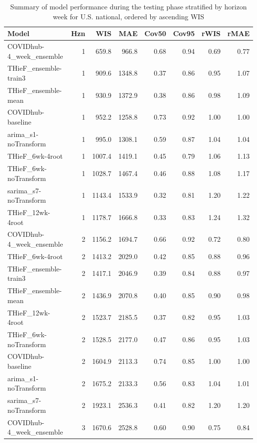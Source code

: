 \documentclass[thesis]{umassthesis}  %
\begin{document}
\begingroup\renewcommand{\arraystretch}{0.75}
\begin{longtable}{lrrrrrrr}
\caption{Summary of model performance during the testing phase stratified by horizon week for U.S. national, ordered by ascending WIS} \\ 
  \hline
Model & Hzn & WIS & MAE & Cov50 & Cov95 & rWIS & rMAE \\ 
  \hline
COVIDhub-4\_week\_ensemble & 1 & 659.8 & 966.8 & 0.68 & 0.94 & 0.69 & 0.77 \\ 
  THieF\_ensemble-train3 & 1 & 909.6 & 1348.8 & 0.37 & 0.86 & 0.95 & 1.07 \\ 
  THieF\_ensemble-mean & 1 & 930.9 & 1372.9 & 0.38 & 0.86 & 0.98 & 1.09 \\ 
  COVIDhub-baseline & 1 & 952.2 & 1258.8 & 0.73 & 0.92 & 1.00 & 1.00 \\ 
  arima\_s1-noTransform & 1 & 995.0 & 1308.1 & 0.59 & 0.87 & 1.04 & 1.04 \\ 
  THieF\_6wk-4root & 1 & 1007.4 & 1419.1 & 0.45 & 0.79 & 1.06 & 1.13 \\ 
  THieF\_6wk-noTransform & 1 & 1028.7 & 1467.4 & 0.46 & 0.88 & 1.08 & 1.17 \\ 
  sarima\_s7-noTransform & 1 & 1143.4 & 1533.9 & 0.32 & 0.81 & 1.20 & 1.22 \\ 
  THieF\_12wk-4root & 1 & 1178.7 & 1666.8 & 0.33 & 0.83 & 1.24 & 1.32 \\ 
  COVIDhub-4\_week\_ensemble & 2 & 1156.2 & 1694.7 & 0.66 & 0.92 & 0.72 & 0.80 \\ 
  THieF\_6wk-4root & 2 & 1413.2 & 2029.0 & 0.42 & 0.85 & 0.88 & 0.96 \\ 
  THieF\_ensemble-train3 & 2 & 1417.1 & 2046.9 & 0.39 & 0.84 & 0.88 & 0.97 \\ 
  THieF\_ensemble-mean & 2 & 1436.9 & 2070.8 & 0.40 & 0.85 & 0.90 & 0.98 \\ 
  THieF\_12wk-4root & 2 & 1523.7 & 2185.5 & 0.37 & 0.82 & 0.95 & 1.03 \\ 
  THieF\_6wk-noTransform & 2 & 1528.5 & 2177.0 & 0.47 & 0.86 & 0.95 & 1.03 \\ 
  COVIDhub-baseline & 2 & 1604.9 & 2113.3 & 0.74 & 0.85 & 1.00 & 1.00 \\ 
  arima\_s1-noTransform & 2 & 1675.2 & 2133.3 & 0.56 & 0.83 & 1.04 & 1.01 \\ 
  sarima\_s7-noTransform & 2 & 1923.1 & 2536.3 & 0.41 & 0.82 & 1.20 & 1.20 \\ 
  COVIDhub-4\_week\_ensemble & 3 & 1670.6 & 2528.8 & 0.60 & 0.90 & 0.75 & 0.84 \\ 

\end{longtable}
\end{document}
